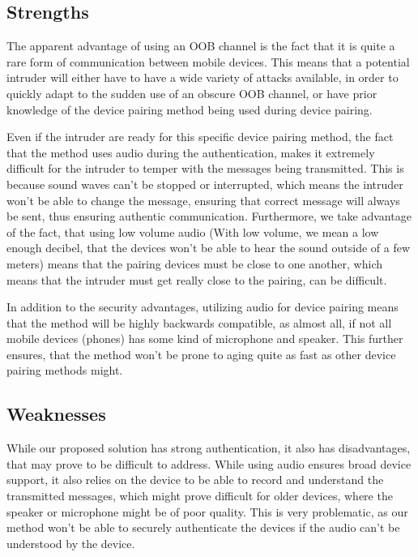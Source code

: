 \documentclass[12pt]{article}
\begin{document}
\subsection{Strengths}
\label{sub:Strengths}

The apparent advantage of using an OOB channel is the fact that it is quite a rare form of communication between mobile devices. This means that a potential intruder will either have to have a wide variety of attacks available, in order to quickly adapt to the sudden use of an obscure OOB channel, or have prior knowledge of the device pairing method being used during device pairing.

Even if the intruder are ready for this specific device pairing method, the fact that the method uses audio during the authentication, makes it extremely difficult for the intruder to temper with the messages being transmitted. This is because sound waves can't be stopped or interrupted, which means the intruder won't be able to change the message, ensuring that correct message will always be sent, thus ensuring authentic communication. Furthermore, we take advantage of the fact, that using low volume audio (With low volume, we mean a low enough decibel, that the devices won't be able to hear the sound outside of a few meters) means that the pairing devices must be close to one another, which means that the intruder must get really close to the pairing, can be difficult.

In addition to the security advantages, utilizing audio for device pairing means that the method will be highly backwards compatible, as almost all, if not all mobile devices (phones) has some kind of microphone and speaker. This further ensures, that the method won't be prone to aging quite as fast as other device pairing methods might.


\subsection{Weaknesses}
\label{sub:Weaknesses}

While our proposed solution has strong authentication, it also has disadvantages, that may prove to be difficult to address. While using audio ensures broad device support, it also relies on the device to be able to record and understand the transmitted messages, which might prove difficult for older devices, where the speaker or microphone might be of poor quality. This is very problematic, as our method won't be able to securely authenticate the devices if the audio can't be understood by the device.
\end{document}
